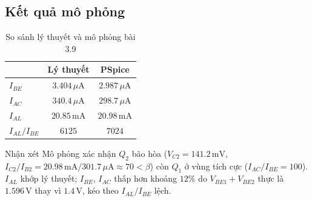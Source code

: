 \subsection{Kết quả mô phỏng}

\begin{table}[H]
\centering
\begin{tabular}{l|c|c}
\toprule
 & Lý thuyết & PSpice \\
\midrule
$I_{BE}$ & $3.404\,\mu\text{A}$ & $2.987\,\mu\text{A}$ \\
$I_{AC}$ & $340.4\,\mu\text{A}$ & $298.7\,\mu\text{A}$ \\
$I_{AL}$ & $20.85\,\text{mA}$ & $20.98\,\text{mA}$ \\
$I_{AL}/I_{BE}$ & $6125$ & $7024$ \\
\bottomrule
\end{tabular}
\caption{So sánh lý thuyết và mô phỏng bài 3.9}
\end{table}

\begin{notebox}{Nhận xét}
Mô phỏng xác nhận $Q_2$ bão hòa ($V_{C2} = 141.2\,\text{mV}$, $I_{C2}/I_{B2} = 20.98\,\text{mA}/301.7\,\mu\text{A} \approx 70 < \beta$) còn $Q_1$ ở vùng tích cực ($I_{AC}/I_{BE} = 100$). $I_{AL}$ khớp lý thuyết; $I_{BE}$, $I_{AC}$ thấp hơn khoảng $12\%$ do $V_{BE1} + V_{BE2}$ thực là $1.596\,\text{V}$ thay vì $1.4\,\text{V}$, kéo theo $I_{AL}/I_{BE}$ lệch.
\end{notebox}
